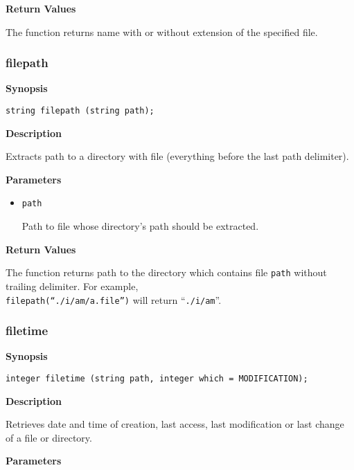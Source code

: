 \documentclass[a4paper, 10pt, titlepage]{article}
\begin{document}
\textbf{Return Values}

The function returns name with or without extension of the specified file.

\subsubsection{filepath}

\textbf{Synopsis}

\begin{verbatim}
string filepath (string path);
\end{verbatim}

\textbf{Description}

Extracts path to a directory with file (everything before the last path delimiter).

\textbf{Parameters}

\begin{itemize}
\item \texttt{path}

Path to file whose directory's path should be extracted.
\end{itemize}

\textbf{Return Values}

The function returns path to the directory which contains file \texttt{path} without trailing delimiter. For example, \\ \texttt{filepath(``./i/am/a.file'')} will return ``\texttt{./i/am}''.

\subsubsection{filetime}

\textbf{Synopsis}

\begin{verbatim}
integer filetime (string path, integer which = MODIFICATION);
\end{verbatim}

\textbf{Description}

Retrieves date and time of creation, last access, last modification or last change of a file or directory.

\textbf{Parameters}
\end{document}
